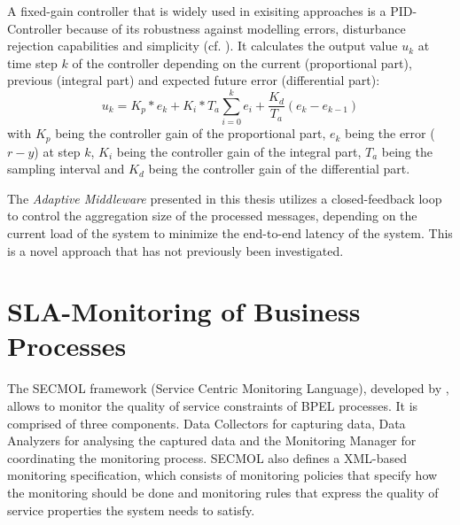 A fixed-gain controller that is widely used in exisiting approaches is a \ac{PID}-Controller because of its robustness against modelling errors, disturbance rejection capabilities and simplicity (cf. \cite{Patikirikorala:2012ky}). It calculates the output value $u_k$ at time step $k$ of the controller depending on the current (proportional part), previous (integral part) and expected future error (differential part):
\begin{displaymath}
	u_k=K_p*e_k+K_i*T_a\sum_{i=0}^k e_i+\frac{K_d}{T_a}(e_k-e_{k-1})
\end{displaymath}
with $K_p$ being the controller gain of the proportional part, $e_k$ being the error ($r-y$) at step $k$, $K_i$ being the controller gain of the integral part, $T_a$ being the sampling interval and $K_d$ being the controller gain of the differential part.

The \emph{Adaptive Middleware} presented in this thesis utilizes a closed-feedback loop to control the aggregation size of the processed messages, depending on the current load of the system to minimize the end-to-end latency of the system. This is a novel approach that has not previously been investigated.

\section{SLA-Monitoring of Business Processes}
The SECMOL framework (Service Centric Monitoring Language), developed by \citet{Guinea:2009fk}, allows to monitor the quality of service constraints of BPEL processes. It is comprised of three components. Data Collectors for capturing data, Data Analyzers for analysing the captured data and the Monitoring Manager for coordinating the monitoring process. SECMOL also defines a XML-based monitoring specification, which consists of monitoring policies that specify how the monitoring should be done and monitoring rules that express the quality of service properties the system needs to satisfy.

